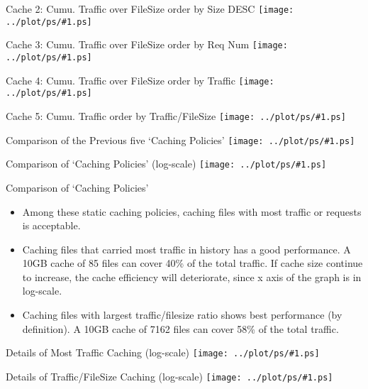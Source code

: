 \documentclass{beamer}
\newcommand\graph[1]{{\texttt{[image: ../plot/ps/\#1.ps]}}}
\begin{document}
\begin{frame}{Cache 2: Cumu. Traffic over FileSize order by Size DESC}
\graph{file-traffic-size-desc-acc}
\end{frame}

\begin{frame}{Cache 3: Cumu. Traffic over FileSize order by Req Num}
\graph{file-traffic-req-acc}
\end{frame}

\begin{frame}{Cache 4: Cumu. Traffic over FileSize order by Traffic}
\graph{file-traffic-traffic-acc}
\end{frame}

\begin{frame}{Cache 5: Cumu. Traffic order by Traffic/FileSize}
\graph{file-traffic-ratio-acc}
\end{frame}

\begin{frame}{Comparison of the Previous five `Caching Policies'}
\graph{file-traffic-five-acc}
\end{frame}

\begin{frame}{Comparison of `Caching Policies' (log-scale)}
\graph{file-traffic-five-acc-log}
\end{frame}

\begin{frame}{Comparison of `Caching Policies'}
\begin{itemize}
  \item Among these static caching policies, caching files with most traffic or requests is acceptable.
  \item Caching files that carried most traffic in history has a good performance. A 10GB cache of 85 files can cover 40\% of the total traffic. If cache size continue to increase, the cache efficiency will deteriorate, since x axis of the graph is in log-scale.
  \item Caching files with largest traffic/filesize ratio shows best performance (by definition). A 10GB cache of 7162 files can cover 58\% of the total traffic.
\end{itemize}
\end{frame}

\begin{frame}{Details of Most Traffic Caching (log-scale)}
\graph{file-traffic-traffic-filenum}
\end{frame}

\begin{frame}{Details of Traffic/FileSize Caching (log-scale)}
\graph{file-traffic-ratio-filenum}
\end{frame}
\end{document}
